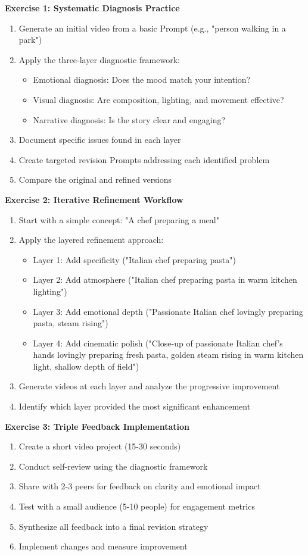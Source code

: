 \textbf{Exercise 1: Systematic Diagnosis Practice}
\begin{enumerate}
\item Generate an initial video from a basic Prompt (e.g., "person walking in a park")
\item Apply the three-layer diagnostic framework:
   \begin{itemize}
   \item Emotional diagnosis: Does the mood match your intention?
   \item Visual diagnosis: Are composition, lighting, and movement effective?
   \item Narrative diagnosis: Is the story clear and engaging?
   \end{itemize}
\item Document specific issues found in each layer
\item Create targeted revision Prompts addressing each identified problem
\item Compare the original and refined versions
\end{enumerate}

\textbf{Exercise 2: Iterative Refinement Workflow}
\begin{enumerate}
\item Start with a simple concept: "A chef preparing a meal"
\item Apply the layered refinement approach:
   \begin{itemize}
   \item Layer 1: Add specificity ("Italian chef preparing pasta")
   \item Layer 2: Add atmosphere ("Italian chef preparing pasta in warm kitchen lighting")
   \item Layer 3: Add emotional depth ("Passionate Italian chef lovingly preparing pasta, steam rising")
   \item Layer 4: Add cinematic polish ("Close-up of passionate Italian chef's hands lovingly preparing fresh pasta, golden steam rising in warm kitchen light, shallow depth of field")
   \end{itemize}
\item Generate videos at each layer and analyze the progressive improvement
\item Identify which layer provided the most significant enhancement
\end{enumerate}

\textbf{Exercise 3: Triple Feedback Implementation}
\begin{enumerate}
\item Create a short video project (15-30 seconds)
\item Conduct self-review using the diagnostic framework
\item Share with 2-3 peers for feedback on clarity and emotional impact
\item Test with a small audience (5-10 people) for engagement metrics
\item Synthesize all feedback into a final revision strategy
\item Implement changes and measure improvement
\end{enumerate}

